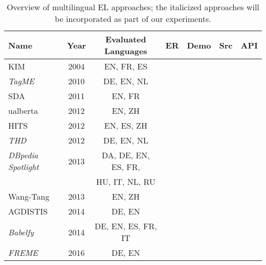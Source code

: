 \documentclass{llncs}
\newcommand{\cmark}{\ding{51}}%
\newcommand{\xmark}{\ding{55}}%
\begin{document}
\begin{table}[t]
	\centering
	\caption{Overview of multilingual EL approaches; the italicized approaches will be incorporated as part of our experiments.}
	\label{tab:multilingual_approaches}
	\setlength{\tabcolsep}{3pt}
	\begin{tabular}{lcccccr}
		\toprule
		\textbf{Name} &  \textbf{Year} & \textbf{Evaluated Languages} & \textbf{ER} & \textbf{Demo} & \textbf{Src} & \textbf{API}\\ \midrule
		
		KIM \cite{KIM-popov2004kim} & 2004 &EN, FR, ES&\cmark&\cmark&\xmark&\cmark\\\midrule
        
        \textit{TagME} \cite{ferragina2010tagme} & 2010 & DE, EN, NL &\cmark&\cmark&\xmark&\cmark\\\midrule
		
		SDA \cite{SDA-charton2011automatic} & 2011 &EN, FR&\cmark&\xmark&\xmark&\xmark\\\midrule
		
		ualberta \cite{guo2012ualberta}& 2012 &EN, ZH&\cmark&\xmark&\xmark&\xmark\\\midrule
		
		HITS \cite{fahrni2012hits} & 2012 & EN, ES, ZH&\cmark&\xmark&\xmark&\xmark\\\midrule
		
		\textit{THD} \cite{THD-dojchinovski2012recognizing}  & 2012 &DE, EN, NL&\cmark&\cmark&\cmark&\cmark\\\midrule 
		
		\textit{DBpedia Spotlight} \cite{mendes2011dbpedia,daiber2013improving} & 2013  &DA, DE, EN, ES, FR,&\cmark&\cmark&\cmark&\cmark\\
		& &HU, IT, NL, RU&&&\\\midrule
		
		Wang-Tang \cite{wang2013boosting} & 2013 & EN, ZH&\cmark&\xmark&\xmark&\xmark\\\midrule
        
        AGDISTIS \cite{usbeck2014agdistis}& 2014 & DE, EN&\xmark&\cmark&\cmark&\cmark\\\midrule
		
		\textit{Babelfy} \cite{Babelfy-moro2014entity}& 2014 &DE, EN, ES, FR, IT &\cmark&\cmark&\xmark&\cmark\\\midrule
		
		\textit{FREME}~\cite{freme-ner2016}&2016&DE, EN&\cmark&\xmark&\cmark&\cmark\\\midrule
		

\end{tabular}
\end{table}
\end{document}
